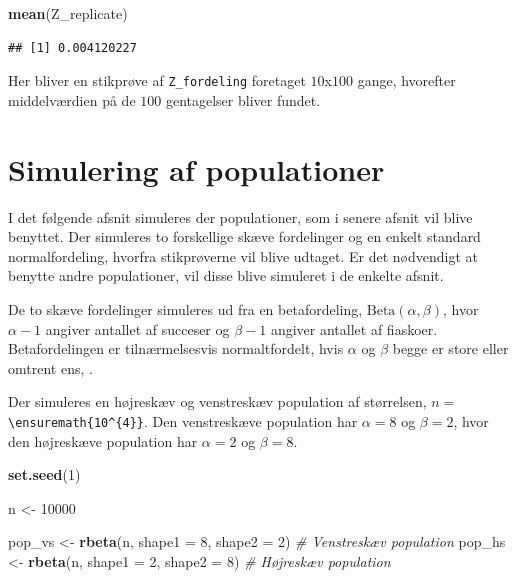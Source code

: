\documentclass[
]{book}
\newenvironment{Shaded}{\begin{snugshade}}{\end{snugshade}}
\newcommand{\CommentTok}[1]{\textcolor[rgb]{0.56,0.35,0.01}{\textit{#1}}}
\newcommand{\DataTypeTok}[1]{\textcolor[rgb]{0.13,0.29,0.53}{#1}}
\newcommand{\DecValTok}[1]{\textcolor[rgb]{0.00,0.00,0.81}{#1}}
\newcommand{\KeywordTok}[1]{\textcolor[rgb]{0.13,0.29,0.53}{\textbf{#1}}}
\newcommand{\NormalTok}[1]{#1}
\newcommand{\StringTok}[1]{\textcolor[rgb]{0.31,0.60,0.02}{#1}}
\theoremstyle{definition}
\theoremstyle{definition}
\theoremstyle{definition}
\theoremstyle{remark}
\begin{document}
\begin{Shaded}
\begin{Highlighting}[]
\KeywordTok{mean}\NormalTok{(Z_replicate)}
\end{Highlighting}
\end{Shaded}

\begin{verbatim}
## [1] 0.004120227
\end{verbatim}

Her bliver en stikprøve af \texttt{Z\_fordeling} foretaget \(10\)x\(100\) gange, hvorefter middelværdien på de \(100\) gentagelser bliver fundet.

\hypertarget{pop-sim}{%
\section{Simulering af populationer}\label{pop-sim}}

I det følgende afsnit simuleres der populationer, som i senere afsnit vil blive benyttet. Der simuleres to forskellige skæve fordelinger og en enkelt standard normalfordeling, hvorfra stikprøverne vil blive udtaget. Er det nødvendigt at benytte andre populationer, vil disse blive simuleret i de enkelte afsnit.

De to skæve fordelinger simuleres ud fra en betafordeling, \(\text{Beta}(\alpha, \beta)\), hvor \(\alpha-1\) angiver antallet af succeser og \(\beta-1\) angiver antallet af fiaskoer. Betafordelingen er tilnærmelsesvis normaltfordelt, hvis \(\alpha\) og \(\beta\) begge er store eller omtrent ens, \citep{TDSBeta}.

Der simuleres en højreskæv og venstreskæv population af størrelsen, \(n=\) \texttt{\textbackslash{}ensuremath\{10\^{}\{4\}\}}. Den venstreskæve population har \(\alpha = 8\) og \(\beta = 2\), hvor den højreskæve population har \(\alpha = 2\) og \(\beta = 8\).

\begin{Shaded}
\begin{Highlighting}[]
\KeywordTok{set.seed}\NormalTok{(}\DecValTok{1}\NormalTok{)}

\NormalTok{n <-}\StringTok{ }\DecValTok{10000}

\NormalTok{pop_vs <-}\StringTok{ }\KeywordTok{rbeta}\NormalTok{(n, }\DataTypeTok{shape1 =} \DecValTok{8}\NormalTok{, }\DataTypeTok{shape2 =} \DecValTok{2}\NormalTok{) }\CommentTok{# Venstreskæv population}
\NormalTok{pop_hs <-}\StringTok{ }\KeywordTok{rbeta}\NormalTok{(n, }\DataTypeTok{shape1 =} \DecValTok{2}\NormalTok{, }\DataTypeTok{shape2 =} \DecValTok{8}\NormalTok{) }\CommentTok{# Højreskæv population}
\end{Highlighting}
\end{Shaded}
\end{document}
